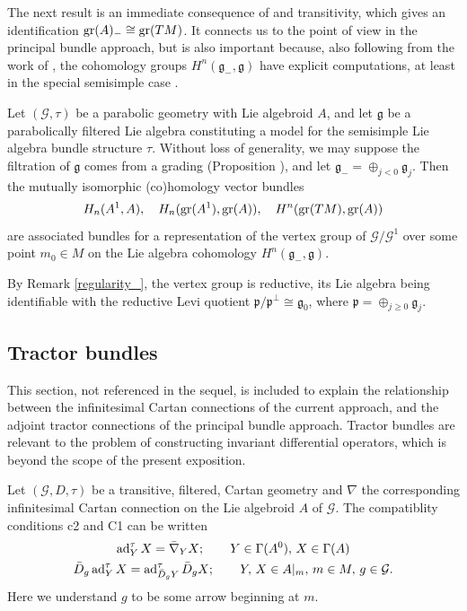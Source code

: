 \documentclass[leqno,12pt]{amsart} %
\begin{document}
The next result is an immediate consequence of  and transitivity,
which gives an identification $\operatorname{\operatorname{gr}}(A)_-\cong \operatorname{\operatorname{gr}}(TM)$. It connects us to the point
of view in the principal bundle approach, but is also important because, also following
from the work of \cite{Kostant_61}, the cohomology groups
$H^n({\mathfrak g}_-, {\mathfrak g})$ have explicit computations, at least in the special
semisimple case \cite[\S3.3]{Cap_Slovak_09}.
\begin{proposition}
  Let $({\mathcal G}, \tau)$ be a parabolic geometry with Lie algebroid $A$, and let
  ${\mathfrak g} $ be a parabolically filtered Lie algebra constituting a model for the
  semisimple Lie algebra bundle structure $\tau$. Without loss of generality, we may
  suppose the filtration of ${\mathfrak g} $ comes from a grading (Proposition
  ), and let
  ${\mathfrak g}_-=\oplus_{j<0} {\mathfrak g}_j$. Then the mutually isomorphic
  (co)homology vector bundles
  $$H_n(A^1,A),\quad H_n(\operatorname{\operatorname{gr}}(A^1),\operatorname{\operatorname{gr}}(A)),\quad H^n(\operatorname{\operatorname{gr}}(TM),\operatorname{\operatorname{gr}}(A))$$
  are associated bundles for a representation of the vertex group of
  ${\mathcal G}/{\mathcal G}^1$ over some point $m_0 \in M$ on the Lie algebra cohomology
  $H^n({\mathfrak g}_-, {\mathfrak g}) $.
\end{proposition}
\begin{remark}
  By Remark \ref{regularity_}, the vertex group is reductive, its Lie algebra being
  identifiable with the reductive Levi quotient
  ${\mathfrak p}/{\mathfrak p}^\perp \cong {\mathfrak g}_0$, where ${\mathfrak p}
  =\oplus_{j\ge 0}{\mathfrak g}_j$.
\end{remark}

\subsection{Tractor bundles}\label{tractors}
This section, not referenced in the sequel, is included to explain the relationship
between the infinitesimal Cartan connections of the current approach, and the adjoint
tractor connections of the principal bundle approach. Tractor bundles are relevant to the
problem of constructing invariant differential operators, which is beyond the scope of the
present exposition.

Let $({\mathcal G}, D, \tau)$ be a transitive, filtered, Cartan geometry and $\nabla $ the
corresponding infinitesimal Cartan connection on the Lie algebroid $A$ of ${\mathcal G} $.
The compatiblity conditions c2 and C1 can be written
\begin{gather*}
  \operatorname{ad}^\tau_Y X = \bar\nabla_YX;\qquad Y \in \Gamma(A^0),\, X \in \Gamma(A)\\
  \bar D_g\operatorname{ad}^\tau_Y X = \operatorname{ad}^\tau_{\bar D_gY}\bar D_gX; \qquad Y,\,X \in A|_m,\,m \in M,\, g \in {\mathcal G}.
\end{gather*}
Here we understand $g$ to be some arrow beginning at $m$.
\end{document}
